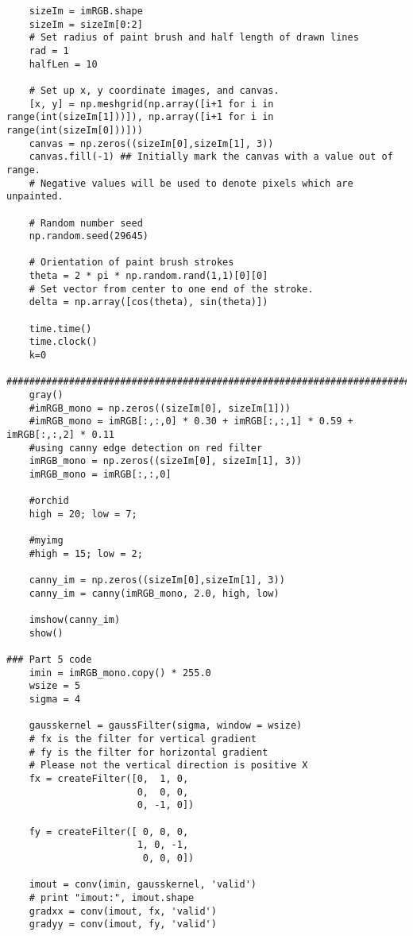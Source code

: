 \documentclass{article}
\begin{document}
\begin{lstlisting}
    sizeIm = imRGB.shape
    sizeIm = sizeIm[0:2]
    # Set radius of paint brush and half length of drawn lines
    rad = 1
    halfLen = 10
    
    # Set up x, y coordinate images, and canvas.
    [x, y] = np.meshgrid(np.array([i+1 for i in range(int(sizeIm[1]))]), np.array([i+1 for i in range(int(sizeIm[0]))]))
    canvas = np.zeros((sizeIm[0],sizeIm[1], 3))
    canvas.fill(-1) ## Initially mark the canvas with a value out of range.
    # Negative values will be used to denote pixels which are unpainted.
    
    # Random number seed
    np.random.seed(29645)
    
    # Orientation of paint brush strokes
    theta = 2 * pi * np.random.rand(1,1)[0][0]
    # Set vector from center to one end of the stroke.
    delta = np.array([cos(theta), sin(theta)])
       
    time.time()
    time.clock()
    k=0

#####################################################################################
    gray()
    #imRGB_mono = np.zeros((sizeIm[0], sizeIm[1]))
    #imRGB_mono = imRGB[:,:,0] * 0.30 + imRGB[:,:,1] * 0.59 + imRGB[:,:,2] * 0.11
    #using canny edge detection on red filter
    imRGB_mono = np.zeros((sizeIm[0], sizeIm[1], 3))
    imRGB_mono = imRGB[:,:,0]
    
    #orchid
    high = 20; low = 7;
    
    #myimg
    #high = 15; low = 2;
    
    canny_im = np.zeros((sizeIm[0],sizeIm[1], 3))
    canny_im = canny(imRGB_mono, 2.0, high, low)
    
    imshow(canny_im)
    show()
    
### Part 5 code    
    imin = imRGB_mono.copy() * 255.0
    wsize = 5
    sigma = 4
    
    gausskernel = gaussFilter(sigma, window = wsize)
    # fx is the filter for vertical gradient
    # fy is the filter for horizontal gradient
    # Please not the vertical direction is positive X
    fx = createFilter([0,  1, 0,
                       0,  0, 0,
                       0, -1, 0])
                       
    fy = createFilter([ 0, 0, 0,
                       1, 0, -1,
                        0, 0, 0])

    imout = conv(imin, gausskernel, 'valid')
    # print "imout:", imout.shape
    gradxx = conv(imout, fx, 'valid')
    gradyy = conv(imout, fy, 'valid')


\end{lstlisting}
\end{document}
